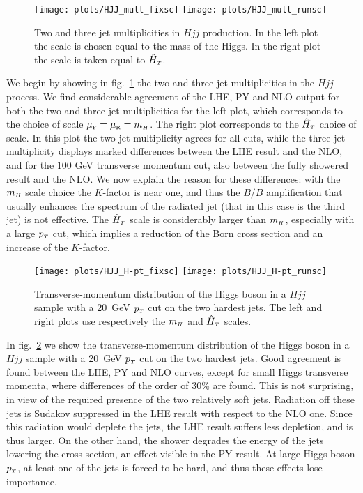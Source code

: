 \documentclass[paper]{JHEP3}
\newlength{\hfig}
\newlength{\hfigs}
\newcommand\muf{\mu_{\sss\rm F}}
\newcommand\mur{\mu_{\sss\rm R}}
\newcommand\mH{m_{\sss  H}}
\newcommand\HThat{\hat{H}_{\sss  T}}
\newcommand\sss{\mathchoice%
{\displaystyle}%
{\scriptstyle}%
{\scriptscriptstyle}%
{\scriptscriptstyle}%
}
\newcommand\pT{p_{\sss T}}
\begin{document}
\begin{figure}[htb]
\begin{center}
\texttt{[image: plots/HJJ\_mult\_fixsc]} \nolinebreak
\texttt{[image: plots/HJJ\_mult\_runsc]} 
\caption{Two and three jet multiplicities in $Hjj$ production. In the left plot
  the scale is chosen equal to the mass of the Higgs. In the right plot the
  scale is taken equal to $\HThat$.}
\label{fig:njjmult}
\end{center}
\end{figure}
We begin by showing in fig.~\ref{fig:njjmult} the two and three jet
multiplicities in the $Hjj$ process.  We find considerable agreement of the
LHE, PY and NLO output for both the two and three jet multiplicities for the
left plot, which corresponds to the choice of scale $\muf=\mur=\mH$. The
right plot corresponds to the $\HThat$ choice of scale. In this plot the two jet
multiplicity agrees for all cuts, while the three-jet multiplicity displays
marked differences between the LHE result and the NLO, and for the $100$ GeV
transverse momentum cut, also between the fully showered result and the
NLO. We now explain the reason for these differences: with the $\mH$
scale choice the $K$-factor is near one, and thus the $\bar{B}/B$
amplification that usually enhances the spectrum of the radiated jet (that in
this case is the third jet) is not effective. The $\HThat$ scale is
considerably larger than $\mH$, especially with a large $\pT$ cut, which
implies a reduction of the Born cross section and an increase of the
$K$-factor.

\begin{figure}[htb]
\begin{center}
\texttt{[image: plots/HJJ\_H-pt\_fixsc]} \nolinebreak
\texttt{[image: plots/HJJ\_H-pt\_runsc]} 
\caption{Transverse-momentum distribution of the Higgs boson in a $Hjj$
  sample with a 20~GeV $\pT$ cut on the two hardest jets. The left and right
  plots use respectively the $\mH$ and $\HThat$ scales.}
\label{fig:HJJ_H-pt}
\end{center}
\end{figure}
In fig.~\ref{fig:HJJ_H-pt} we show the transverse-momentum distribution of
the Higgs boson in a $Hjj$ sample with a 20~GeV $\pT$ cut on the two hardest
jets.  Good agreement is found between the LHE, PY and NLO curves, except for
small Higgs transverse momenta, where differences of the order of 30\% are
found. This is not surprising, in view of the required presence of the two
relatively soft jets. Radiation off these jets is Sudakov suppressed in the
LHE result with respect to the NLO one.  Since this radiation would deplete
the jets, the LHE result suffers less depletion, and is thus larger. On the
other hand, the shower degrades the energy of the jets lowering the cross
section, an effect visible in the PY result. At large Higgs boson $\pT$, at
least one of the jets is forced to be hard, and thus these effects lose
importance.
\end{document}
